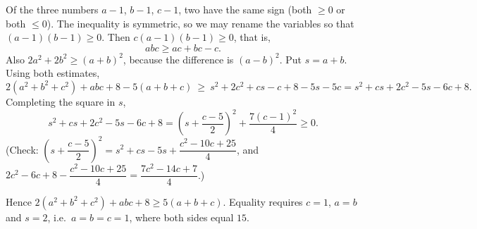 Of the three numbers $a-1$, $b-1$, $c-1$, two have the same sign (both $\ge0$ or both $\le0$). The inequality is symmetric, so we may rename the variables so that $(a-1)(b-1)\ge0$. Then $c(a-1)(b-1)\ge0$, that is,
\[
abc\ge ac+bc-c .
\]
Also $2a^2+2b^2\ge(a+b)^2$, because the difference is $(a-b)^2$. Put $s=a+b$. Using both estimates,
\[
2(a^2+b^2+c^2)+abc+8-5(a+b+c)\ \ge\ s^2+2c^2+cs-c+8-5s-5c=s^2+cs+2c^2-5s-6c+8 .
\]
Completing the square in $s$,
\[
s^2+cs+2c^2-5s-6c+8=\left(s+\dfrac{c-5}{2}\right)^2+\dfrac{7(c-1)^2}{4}\ge0 .
\]
(Check: $\left(s+\dfrac{c-5}{2}\right)^2=s^2+cs-5s+\dfrac{c^2-10c+25}{4}$, and $2c^2-6c+8-\dfrac{c^2-10c+25}{4}=\dfrac{7c^2-14c+7}{4}$.)

Hence $2(a^2+b^2+c^2)+abc+8\ge5(a+b+c)$. Equality requires $c=1$, $a=b$ and $s=2$, i.e.\ $a=b=c=1$, where both sides equal $15$.

